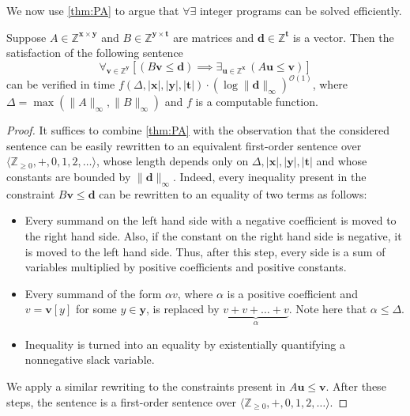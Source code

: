 \documentclass{theoretics}
\renewcommand{\leq}{\leqslant}
\renewcommand{\geq}{\geqslant}
\newcommand{\Z}{\mathbb{Z}}
\newcommand{\Zn}{\Z_{\geq 0}}
\newcommand{\tup}[1]{{\mathbf{#1}}}
\newcommand{\xx}{\tup x}
\newcommand{\yy}{\tup y}
\newcommand{\tv}{\tup t}
\newcommand{\dd}{\tup d}
\newcommand{\uu}{\tup u}
\newcommand{\myvv}{\tup v} %
\newcommand{\matrices}[3]{#1^{#2\times #3}}
\newcommand{\Oh}{{\mathcal{O}}}
\begin{document}

We now use \cref{thm:PA} to argue that $\forall\exists$ integer programs can be solved efficiently.

\begin{lemma}\label{thm:EisenbrandShmonin}
Suppose $A\in \matrices{\Z}{\xx}{\yy}$ and $B\in \matrices{\Z}{\yy}{\tv}$ are matrices and $\dd\in \Z^\tv$ is a vector. Then the satisfaction of the following sentence
$$\forall_{\myvv\in \Z^\yy} \left[(B\myvv\leq \dd) \implies \exists_{\uu\in \Z^\xx}\, (A\uu\leq \myvv)\right]$$
can be verified in time $f(\Delta,|\xx|,|\yy|,|\tv|)\cdot \left(\log \|\dd\|_\infty\right)^{\Oh(1)}$, where $\Delta=\max(\|A\|_\infty,\|B\|_\infty)$ and $f$ is a computable function.
\end{lemma}
\begin{proof}
    It suffices to combine \cref{thm:PA} with the observation that the considered sentence can be easily rewritten to an equivalent first-order sentence over $\langle \Zn,+,0,1,2,\ldots \rangle$, whose length depends only on $\Delta,|\xx|,|\yy|,|\tv|$ and whose constants are bounded by $\|\dd\|_\infty$. Indeed, every inequality present in the constraint $B\myvv\leq \dd$ can be rewritten to an equality of two terms as follows:
    \begin{itemize}[nosep]
    \item Every summand on the left hand side with a negative coefficient is moved to the right hand side. Also, if the constant on the right hand side is negative, it is moved to the left hand side. Thus, after this step, every side is a sum of variables multiplied by positive coefficients and positive constants.
    \item Every summand of the form $\alpha v$, where $\alpha$ is a positive coefficient and $v=\myvv[y]$ for some $y\in \yy$, is replaced by $\underbrace{v+v+\ldots+v}_\alpha$. Note here that $\alpha\leq \Delta$.
    \item Inequality is turned into an equality by existentially quantifying a nonnegative slack variable.
    \end{itemize}
    We apply a similar rewriting to the constraints present in $A\uu\leq \myvv$. After these steps, the sentence is a first-order sentence over $\langle \Zn,+,0,1,2,\ldots \rangle$.
\end{proof}
\end{document}
